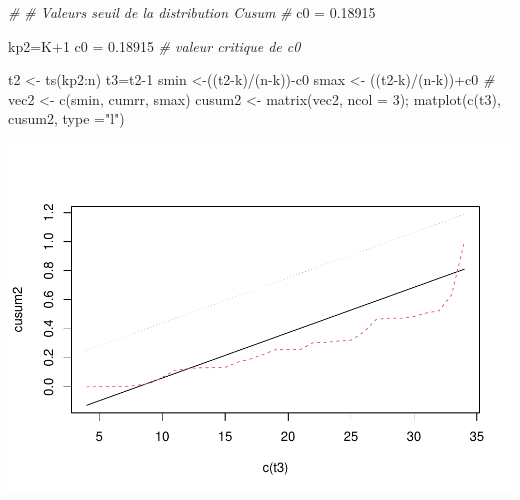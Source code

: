 \documentclass[
]{article}
\newenvironment{Shaded}{\begin{snugshade}}{\end{snugshade}}
\newcommand{\AttributeTok}[1]{\textcolor[rgb]{0.77,0.63,0.00}{#1}}
\newcommand{\CommentTok}[1]{\textcolor[rgb]{0.56,0.35,0.01}{\textit{#1}}}
\newcommand{\DecValTok}[1]{\textcolor[rgb]{0.00,0.00,0.81}{#1}}
\newcommand{\FloatTok}[1]{\textcolor[rgb]{0.00,0.00,0.81}{#1}}
\newcommand{\FunctionTok}[1]{\textcolor[rgb]{0.00,0.00,0.00}{#1}}
\newcommand{\NormalTok}[1]{#1}
\newcommand{\OtherTok}[1]{\textcolor[rgb]{0.56,0.35,0.01}{#1}}
\newcommand{\SpecialCharTok}[1]{\textcolor[rgb]{0.00,0.00,0.00}{#1}}
\newcommand{\StringTok}[1]{\textcolor[rgb]{0.31,0.60,0.02}{#1}}
\begin{document}
\begin{Shaded}
\begin{Highlighting}[]
\CommentTok{\#}
\CommentTok{\# Valeurs seuil de la distribution Cusum}
\CommentTok{\#}
\NormalTok{c0 }\OtherTok{=} \FloatTok{0.18915}

\NormalTok{kp2}\OtherTok{=}\NormalTok{K}\SpecialCharTok{+}\DecValTok{1}
\NormalTok{c0 }\OtherTok{=} \FloatTok{0.18915} \CommentTok{\# valeur critique de c0}

\NormalTok{t2 }\OtherTok{\textless{}{-}} \FunctionTok{ts}\NormalTok{(kp2}\SpecialCharTok{:}\NormalTok{n)}
\NormalTok{t3}\OtherTok{=}\NormalTok{t2}\DecValTok{{-}1}
\NormalTok{smin }\OtherTok{\textless{}{-}}\NormalTok{((t2}\SpecialCharTok{{-}}\NormalTok{k)}\SpecialCharTok{/}\NormalTok{(n}\SpecialCharTok{{-}}\NormalTok{k))}\SpecialCharTok{{-}}\NormalTok{c0}
\NormalTok{smax }\OtherTok{\textless{}{-}}\NormalTok{ ((t2}\SpecialCharTok{{-}}\NormalTok{k)}\SpecialCharTok{/}\NormalTok{(n}\SpecialCharTok{{-}}\NormalTok{k))}\SpecialCharTok{+}\NormalTok{c0}
\CommentTok{\#}
\NormalTok{vec2 }\OtherTok{\textless{}{-}} \FunctionTok{c}\NormalTok{(smin, cumrr, smax)}
\NormalTok{cusum2 }\OtherTok{\textless{}{-}} \FunctionTok{matrix}\NormalTok{(vec2, }\AttributeTok{ncol =} \DecValTok{3}\NormalTok{); }
\FunctionTok{matplot}\NormalTok{(}\FunctionTok{c}\NormalTok{(t3), cusum2, }\AttributeTok{type =}\StringTok{"l"}\NormalTok{)}
\end{Highlighting}
\end{Shaded}

\includegraphics{Projet_econometrie_II_files/figure-latex/unnamed-chunk-6-2.pdf}
\end{document}

